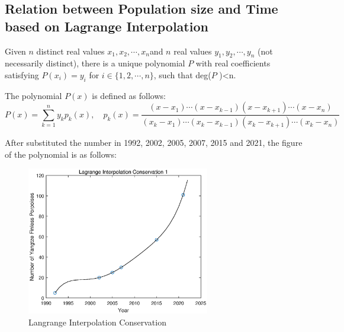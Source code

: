 \documentclass{mcmthesis}
\numberwithin{figure}{section}
\numberwithin{table}{section}
\numberwithin{equation}{section}
\begin{document}
\subsection{Relation between Population size and Time based on Lagrange Interpolation}
Given $ n $ distinct real values $ x_1, x_2, \cdots , x_n $and $ n $
real values $ y_1, y_2,\cdots, y_n $ (not necessarily distinct), there
is a unique polynomial $ P $ with real coefficients satisfying 
$ P(x_i)= y_i $ for $ i \in \{1,2,\cdots,n\} $, such that deg($ P $ )<n.
\par
The polynomial $ P(x) $ is defined as follows:   
$$
  P(x) = \sum \limits _{k = 1}^ny_kp_k(x),\quad
  p_k(x) = \frac{(x-x_1)\cdots (x-x_{k-1})(x-x_{k+1})\cdots (x-x_n)}{
    (x_k-x_1)\cdots (x_k-x_{k-1})(x_k-x_{k+1})\cdots (x_k-x_n)
  }
$$

After substituted the number in 1992, 2002, 2005, 2007, 2015 and 2021,
the figure of the polynomial is as follows:
\begin{figure}[htbp!]
  \centering
  \includegraphics[width = 8cm]{codes/Lagrange.eps}
  \caption{Langrange Interpolation Conservation}
\end{figure}
\end{document}
